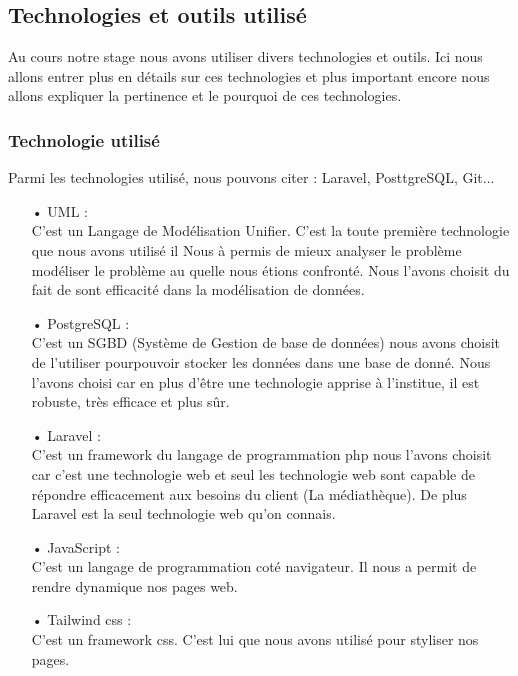 \documentclass[12pt,a4paper]{article}
\begin{document}
\subsection{Technologies et outils utilisé}
Au cours notre stage nous avons utiliser divers technologies et outils. Ici nous allons 
entrer plus en détails sur ces technologies et plus important encore nous allons 
expliquer la pertinence et le pourquoi de ces technologies.\\
\subsubsection{Technologie utilisé}
Parmi les technologies utilisé, nous pouvons citer : Laravel, PosttgreSQL, Git...
\begin{itemize}
\item[•] UML : \\
C'est un Langage de Modélisation Unifier. C'est la toute première technologie que nous avons
utilisé il Nous à permis de mieux analyser le problème modéliser le problème au quelle
nous étions confronté. Nous l'avons choisit du fait de sont efficacité dans la modélisation
de données.
\item[•] PostgreSQL : \\
C'est un SGBD (Système de Gestion de base de données) nous avons choisit de l'utiliser
pourpouvoir stocker les données dans une base de donné. Nous l'avons choisi car en
plus d'être une technologie apprise à l'institue, il est robuste, très efficace et plus
sûr.
\item[•] Laravel : \\
C'est un framework du langage de programmation php nous l'avons choisit car c'est une
technologie web et seul les technologie web sont capable de répondre efficacement aux besoins du
client (La médiathèque). De plus Laravel est la seul technologie web qu'on connais.
\item[•] JavaScript : \\
C'est un langage de programmation coté navigateur. Il nous a permit de rendre dynamique nos pages
web.
\item[•] Tailwind css : \\
C'est un framework css. C'est lui que nous avons utilisé pour styliser nos pages.
\end{itemize}
\end{document}
